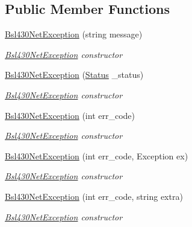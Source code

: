\subsection*{Public Member Functions}
\begin{DoxyCompactItemize}
\item 
\mbox{\hyperlink{class_b_s_l430___n_e_t_1_1_bsl430_net_exception_a2ac11a751f784f83d83986174b27621f}{Bsl430\+Net\+Exception}} (string message)
\begin{DoxyCompactList}\small\item\em \mbox{\hyperlink{class_b_s_l430___n_e_t_1_1_bsl430_net_exception}{Bsl430\+Net\+Exception}} constructor \end{DoxyCompactList}\item 
\mbox{\hyperlink{class_b_s_l430___n_e_t_1_1_bsl430_net_exception_aa6866836ebcd036734e7a039155dbb94}{Bsl430\+Net\+Exception}} (\mbox{\hyperlink{class_b_s_l430___n_e_t_1_1_status}{Status}} \+\_\+status)
\begin{DoxyCompactList}\small\item\em \mbox{\hyperlink{class_b_s_l430___n_e_t_1_1_bsl430_net_exception}{Bsl430\+Net\+Exception}} constructor \end{DoxyCompactList}\item 
\mbox{\hyperlink{class_b_s_l430___n_e_t_1_1_bsl430_net_exception_a011e83246de12e6056763597b4d0acfd}{Bsl430\+Net\+Exception}} (int err\+\_\+code)
\begin{DoxyCompactList}\small\item\em \mbox{\hyperlink{class_b_s_l430___n_e_t_1_1_bsl430_net_exception}{Bsl430\+Net\+Exception}} constructor \end{DoxyCompactList}\item 
\mbox{\hyperlink{class_b_s_l430___n_e_t_1_1_bsl430_net_exception_a2e6a4d74e4dece76316cfd777178087b}{Bsl430\+Net\+Exception}} (int err\+\_\+code, Exception ex)
\begin{DoxyCompactList}\small\item\em \mbox{\hyperlink{class_b_s_l430___n_e_t_1_1_bsl430_net_exception}{Bsl430\+Net\+Exception}} constructor \end{DoxyCompactList}\item 
\mbox{\hyperlink{class_b_s_l430___n_e_t_1_1_bsl430_net_exception_a62e05fca7f91b8abbbe59db70f2443c2}{Bsl430\+Net\+Exception}} (int err\+\_\+code, string extra)
\begin{DoxyCompactList}\small\item\em \mbox{\hyperlink{class_b_s_l430___n_e_t_1_1_bsl430_net_exception}{Bsl430\+Net\+Exception}} constructor \end{DoxyCompactList}\end{DoxyCompactItemize}
